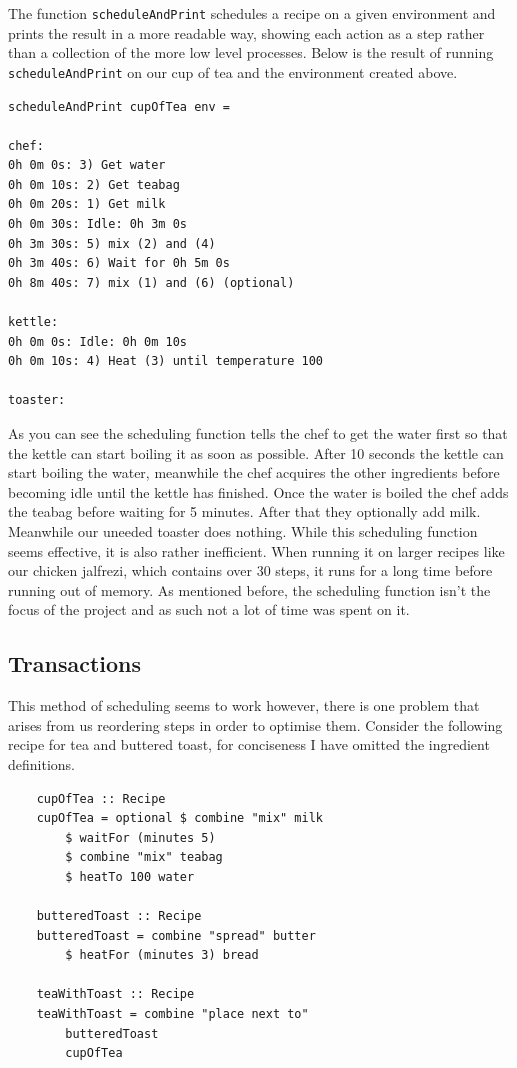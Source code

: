 \documentclass[11pt]{article}
\begin{document}
\medbreak

The function \texttt{scheduleAndPrint} schedules a recipe on a given environment
and prints the result in a more readable way, showing each action as a step rather
than a collection of the more low level processes. Below is the result of running
\texttt{scheduleAndPrint} on our cup of tea and the environment created above.

\begin{lstlisting}
scheduleAndPrint cupOfTea env = 

chef:
0h 0m 0s: 3) Get water
0h 0m 10s: 2) Get teabag
0h 0m 20s: 1) Get milk
0h 0m 30s: Idle: 0h 3m 0s
0h 3m 30s: 5) mix (2) and (4)
0h 3m 40s: 6) Wait for 0h 5m 0s
0h 8m 40s: 7) mix (1) and (6) (optional)

kettle:
0h 0m 0s: Idle: 0h 0m 10s
0h 0m 10s: 4) Heat (3) until temperature 100

toaster:
\end{lstlisting}

As you can see the scheduling function tells the chef to get the water first so that the
kettle can start boiling it as soon as possible. After 10 seconds the kettle can start
boiling the water, meanwhile the chef acquires the other ingredients before becoming idle
until the kettle has finished. Once the water is boiled the chef adds the teabag before
waiting for 5 minutes. After that they optionally add milk. Meanwhile our uneeded toaster
does nothing. While this scheduling function seems effective, it is also rather inefficient.
When running it on larger recipes like our chicken jalfrezi, which contains over 30 steps,
it runs for a long time before running out of memory. As mentioned before, the scheduling
function isn't the focus of the project and as such not a lot of time was spent on it.

\subsection{Transactions}

This method of scheduling seems to work however, there is one problem that arises from us
reordering steps in order to optimise them. Consider the following recipe for tea and buttered toast,
for conciseness I have omitted the ingredient definitions.

\begin{lstlisting}
    cupOfTea :: Recipe
    cupOfTea = optional $ combine "mix" milk
        $ waitFor (minutes 5)
        $ combine "mix" teabag
        $ heatTo 100 water

    butteredToast :: Recipe
    butteredToast = combine "spread" butter
        $ heatFor (minutes 3) bread

    teaWithToast :: Recipe
    teaWithToast = combine "place next to"
        butteredToast
        cupOfTea
\end{lstlisting}
\end{document}
